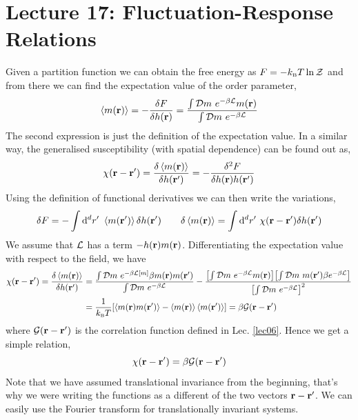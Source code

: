 \section*{Lecture 17: Fluctuation-Response Relations}
Given a partition function we can obtain the free energy as $F = -k_{\text{\tiny B}} T \ln \mathcal Z$ and from there we can find the expectation value of the order parameter, 
\begin{equation}
    \avg{m(\vb{r})}  = -\fdv{F}{h(\vb{r})} = \frac{\int\SD m\ e^{-\beta \SL} m(\vb{r})}{\int \SD m \ e^{-\beta\SL}}
\end{equation}
The second expression is just the definition of the expectation value. In a similar way, the generalised susceptibility (with spatial dependence) can be found out as,
\begin{equation}
   \chi(\vb{r} - \vb{r}') = \frac{\delta \left\langle  m(\vb{r}) \right\rangle}{\delta h(\vb{r}')} = -\frac{\delta^2 F}{\delta h(\vb{r})h(\vb{r}')}
\end{equation}
Using the definition of functional derivatives we can then write the variations,
\begin{align*}
    \delta F = - \int \dd^dr'\ \left\langle m(\vb{r'}) \right\rangle \delta h(\vb{r}')\qquad  \delta \left\langle m(\vb{r}) \right\rangle =  \int \dd^dr'\ \chi(\vb{r} - \vb{r}')  \delta h(\vb{r}')
\end{align*}
We assume that $\mathcal L$ has a term $-h(\vb{r})m(\vb{r})$. Differentiating the expectation value with respect to the field, we have 
\begin{align}
    \begin{split}
  \chi(\vb{r}-\vb{r}')= \frac{\delta \left\langle  m(\vb{r}) \right\rangle}{\delta h(\vb{r}')} &= \frac{\int\mathcal D m\ e^{-\beta \mathcal L[m]}\beta m(\vb{r}) m(\vb{r}')}{\int \mathcal D m \ e^{-\beta\mathcal L}} -\frac{\qty[\int\mathcal D m\ e^{-\beta \mathcal L} m(\vb{r})]\qty[\int \mathcal D m \ m(\vb{r}') \beta e^{-\beta\mathcal L}]}{\qty[\int \mathcal D m \ e^{-\beta\mathcal L}]^2}\\
   &=\frac{1}{k_{\text{\tiny B}} T}\qty[\left\langle m(\vb{r})m(\vb{r}') \right\rangle -\left\langle m(\vb{r}) \right\rangle\left\langle m(\vb{r}') \right\rangle ] = \beta \mathcal G(\vb{r} - \vb{r}')
    \end{split}
\end{align}
where $\mathcal G(\vb{r} - \vb{r}')$ is the correlation function defined in Lec. \ref{lec06}. Hence we get a simple relation,
$$\chi(\vb{r}-\vb{r}') = \beta \mathcal G(\vb{r}-\vb{r}')$$
Note that we have assumed translational invariance from the beginning, that's why we were writing the functions as a different of the two vectors $\vb{r}-\vb{r}'$. We can easily use the Fourier transform for translationally invariant systems.
